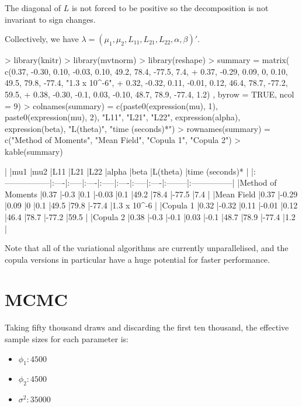 \documentclass{article}
\begin{document}
The diagonal of $L$ is not forced to be positive so the decomposition is not invariant to sign changes.

Collectively, we have $\lambda = (\mu_1, \mu_2, L_{11}, L_{21}, L_{22}, \alpha, \beta)'$.

\begin{Schunk}
\begin{Sinput}
> library(knitr)
> library(mvtnorm)
> library(reshape)
> summary = matrix( c(0.37, -0.30, 0.10, -0.03, 0.10, 49.2, 78.4, -77.5, 7.4,
+                     0.37, -0.29, 0.09, 0, 0.10, 49.5, 79.8, -77.4, "1.3 x 10^{-6}", 
+                     0.32, -0.32, 0.11, -0.01, 0.12, 46.4, 78.7, -77.2, 59.5, 
+                     0.38, -0.30, -0.1, 0.03, -0.10, 48.7, 78.9, -77.4, 1.2) , byrow = TRUE, ncol = 9)
> colnames(summary) = c(paste0(expression(mu), 1), paste0(expression(mu), 2), "L11", "L21", "L22", expression(alpha), expression(beta), "L(theta)", "time (seconds)*")
> rownames(summary) = c("Method of Moments", "Mean Field", "Copula 1", "Copula 2")
> kable(summary)
\end{Sinput}
\begin{Soutput}
|                  |mu1  |mu2   |L11  |L21   |L22  |alpha |beta |L(theta) |time (seconds)* |
|:-----------------|:----|:-----|:----|:-----|:----|:-----|:----|:--------|:---------------|
|Method of Moments |0.37 |-0.3  |0.1  |-0.03 |0.1  |49.2  |78.4 |-77.5    |7.4             |
|Mean Field        |0.37 |-0.29 |0.09 |0     |0.1  |49.5  |79.8 |-77.4    |1.3 x 10^{-6}   |
|Copula 1          |0.32 |-0.32 |0.11 |-0.01 |0.12 |46.4  |78.7 |-77.2    |59.5            |
|Copula 2          |0.38 |-0.3  |-0.1 |0.03  |-0.1 |48.7  |78.9 |-77.4    |1.2             |
\end{Soutput}
\end{Schunk}
\*Note that all of the variational algorithms are currently unparallelised, and the copula versions in particular have a huge potential for faster performance.

\section{MCMC}

Taking fifty thousand draws and discarding the first ten thousand, the effective sample sizes for each parameter is:
\begin{itemize}
\item $\phi_1 : 4500$
\item $\phi_2 : 4500$
\item $\sigma^2: 35000$
\end{itemize}
\end{document}
